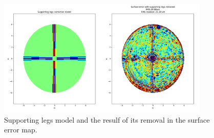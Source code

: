\begin{figure}
    \centering
    \includegraphics[width=0.9\textwidth]{images/legs_removal.png}
    \caption{Supporting legs model and the resulf of its removal in the surface error map.}
    \label{fig:legs_removal}
\end{figure}






